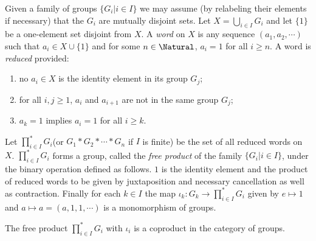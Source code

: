 \begin{definition}
	Given a family of groups $ \{G_i|i \in I \} $ we may assume (by relabeling their elements if necessary) that the $ G_i $ are mutually disjoint sets. Let $ X=\bigcup_{i \in I} G_i $ and let $ \{1 \} $ be a one-element set disjoint from $ X $. A \textit{word} on $ X $ is any sequence $ (a_1,a_2,\cdots) $ such that $ a_i \in X \cup \{ 1\} $ and for some $ n \in \Natural $, $ a_i =1 $ for all $ i \geqslant n $. A word is \textit{reduced} provided:
	\begin{enumerate}
		\item no $ a_i \in X $ is the identity element in its group $ G_j $;
		\item for all $ i,j \geqslant 1 $, $ a_i $ and $ a_{i+1} $ are not in the same group $ G_j $;
		\item $ a_k=1 $ implies $ a_i=1 $ for all $ i \geqslant k $.
	\end{enumerate}
Let $ \prod_{i \in I}^{\ast}G_i $(or $ G_1 \ast G_2 \ast \cdots \ast G_n $ if $ I $ is finite) be the set of all reduced words on $ X $. $ \prod_{i \in I}^{\ast}G_i $ forms a group, called the \textit{free product} of the family $ \{G_i | i\in I \} $, under the binary operation defined as follows. $ 1 $ is the identity element and the product of reduced words to be given by juxtaposition and necessary cancellation as well as contraction. Finally for each $ k \in I $ the map $ \iota_k:G_k \to \prod_{i \in I}^{\ast}G_i $ given by $ e \mapsto 1 $ and $ a \mapsto a = (a,1,1,\cdots) $ is a monomorphism of groups.
\end{definition}
\begin{theorem}
	The free product $ \prod_{i \in I}^{\ast}G_i $ with $ \iota_i $ is a coproduct in the category of groups.
\end{theorem}